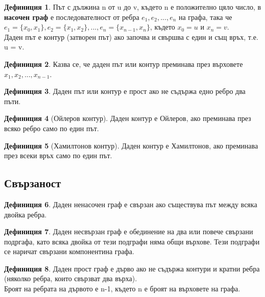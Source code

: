 \documentclass[fleqn, 12pt]{article}
\theoremstyle{definition}
\newtheorem{definition}{Дефиниция}[subsection]
\begin{document}
\begin{definition}
Път с дължина n от u до v, където n е положително цяло число, в \textbf{насочен граф} е последователност от ребра $e_1, e_2, ..., e_n$ на графа, така че $e_1= \{x_0, x_1\}, e_2= \{x_1, x_2\}, ..., e_n= \{x_{n-1}, x_n\}$, където $x_0= u$ и $x_n= v$.\\
Даден път е контур (затворен път) ако започва и свършва с един и същ връх, т.е. u = v. 
\end{definition}

\begin{definition}
Казва се, че даден път или контур преминава през върховете $x_1, x_2, ..., x_{n-1}$.
\end{definition}

\begin{definition}
Даден път или контур е прост ако не съдържа едно ребро два пъти.
\end{definition}

\begin{definition}[Ойлеров контур]
Даден контур е Ойлеров, ако преминава през всяко ребро само по един път. 
\end{definition}

\begin{definition}[Хамилтонов контур]
Даден контур е Хамилтонов, ако преминава през всеки връх само по един път. 
\end{definition}

\subsection{Свързаност}
\begin{definition}
Даден ненасочен граф е свързан ако съществува път между всяка двойка ребра.
\end{definition}

\begin{definition}
Даден несвързан граф е обединение на два или повече свързани подргафа, като всяка двойка от тези подграфи няма общи върхове. Тези подграфи се наричат свързани компонентина графа.
\end{definition}

\begin{definition}
Даден прост граф е дърво ако не съдържа контури и кратни ребра (няколко ребра, които свързват два върха).\\
Броят на ребрата на дървото е n-1, където n е броят на върховете на графа.
\end{definition}
\end{document}
